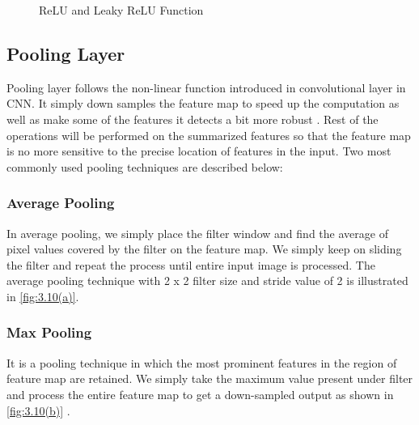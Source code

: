 
\begin{figure}%
    \centering
    \qquad
    \caption{ReLU and Leaky ReLU Function}%
    \label{fig:3.9}%
\end{figure}

\subsection{Pooling Layer}
Pooling layer follows the non-linear function introduced in convolutional layer 
in CNN. It simply down samples the feature map to 
speed up the computation as well as make some of the features it detects a bit 
more robust \cite{chap_3_article:4}. Rest of the operations will be performed on the summarized features so that the feature map is no more sensitive to the
 precise location of features in the input. Two most 
commonly used pooling techniques are described below:

\subsubsection{Average Pooling}

In average pooling, we simply place the filter window and 
find the average of pixel values covered by the filter on 
the feature map. We simply keep on sliding the filter and repeat 
the process until entire input image is processed. The average pooling 
technique with 2 x 2 filter size and 
stride value of 2 is illustrated in \ref{fig:3.10(a)}.

\subsubsection{Max Pooling}
It is a pooling technique in which the most prominent 
features in the region of feature map are retained. We simply 
take the maximum value present under filter and process the entire 
feature map to get a down-sampled output as shown in \ref{fig:3.10(b)} \cite{chap_3_article:6}.

